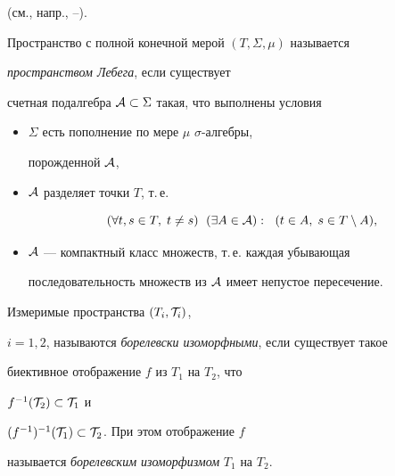 (см., напр., \cite{28}--\cite{30}).





\begin{defn}


Пространство с полной конечной мерой $(T,\Sigma, \mu)$ называется


{\it про\-ст\-ран\-ст\-вом Ле\-бе\-га}, если существует


счетная подалгебра ${\cal A}\subset\Sigma$ такая, что выполнены условия


\begin{itemize}


\item[a)] $\Sigma$ есть пополнение по мере $\mu$\; $\sigma$-ал\-геб\-ры,


порожденной $\cal A$,


\item[b)] $\cal A$ разделяет точки $T$, т.\,е.


$$


(\forall t,s\in T,\; t\ne s)\;\ (\exists A\in{\cal A}):\;\ 


(t\in A,\; s\in T\setminus A),


$$


\item[c)] $\cal A$ --- компактный класс множеств, т.\,е. каждая убывающая


последовательность множеств из $\cal A$ имеет непустое пересечение.


\end{itemize}


\end{defn}





\begin{defn}


Измеримые пространства $(T_i,{\cal T}_i)$,


$i=1,2$, называются {\it борелевски изоморфными}, если существует такое


биективное отображение $f$ из $T_1$ на $T_2$, что


$f^{-1}({\cal T}_2)\subset{\cal T}_1$ и


$(f^{-1})^{-1}({\cal T}_1)\subset{\cal T}_2$. При этом отображение $f$


называется {\it борелевским изоморфизмом} $T_1$ на $T_2$.


\end{defn}






